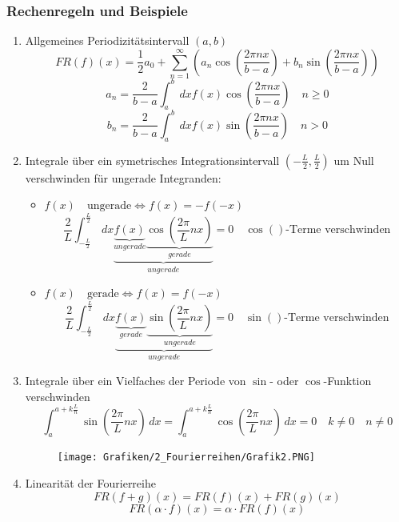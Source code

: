 \subsubsection{Rechenregeln und Beispiele}
\begin{enumerate}[label=(\roman*)]
	\item Allgemeines Periodizitätsintervall $(a,b)$
		$$FR(f)(x)= \frac{1}{2} a_0 + \sum_{n=1}^\infty \left( a_n \cos\left(\frac{2\pi n x}{b-a}\right) + b_n \sin\left(\frac{2\pi n x}{b-a}\right) \right)$$
		$$a_n = \frac{2}{b-a} \int_{a}^{b} \,dx f(x) \cos \left(\frac{2\pi n x}{b-a}\right) \quad n \geq 0$$
		$$b_n = \frac{2}{b-a} \int_{a}^{b} \,dx f(x) \sin \left(\frac{2\pi n x}{b-a}\right) \quad n>0$$	

	\item Integrale über ein symetrisches Integrationsintervall 
		$\left(-\frac{L}{2}, \frac{L}{2} \right)$ um Null verschwinden
		für ungerade Integranden:
		\begin{itemize}
			\item $f(x) \quad \textrm{ungerade} \Leftrightarrow f(x) = -f(-x)$ 
				$$\frac{2}{L} \int_{-\frac{L}{2}}^{\frac{L}{2}} \,dx \underbrace{\underbrace{f(x)}_{ungerade} \underbrace{\cos\left(\frac{2\pi}{L} n x\right)}_{gerade}}_{ungerade} = 0 \quad \cos()\textrm{-Terme verschwinden}$$
			\item $f(x) \quad \textrm{gerade} \Leftrightarrow f(x) = f(-x)$
				$$\frac{2}{L} \int_{-\frac{L}{2}}^{\frac{L}{2}} \,dx \underbrace{\underbrace{f(x)}_{gerade} \underbrace{\sin\left(\frac{2\pi}{L} n x\right)}_{ungerade}}_{ungerade} = 0 \quad \sin()\textrm{-Terme verschwinden}$$
		\end{itemize}
	\item Integrale über ein Vielfaches der Periode von $\sin$- oder 			$\cos$-Funktion verschwinden
		$$\int_{a}^{a+k\frac{L}{n}} \sin\left(\frac{2\pi}{L} n x\right) \,dx =
		\int_{a}^{a+k\frac{L}{n}} \cos\left(\frac{2\pi}{L} n x\right) \,dx = 0
		\quad k\neq 0 \quad n \neq 0$$
		\begin{figure}[H]
			\centering
			\texttt{[image: Grafiken/2\_Fourierreihen/Grafik2.PNG]}
		\end{figure}
	\item Linearität der Fourierreihe
		$$FR(f+g)(x) = FR(f)(x) + FR(g)(x)$$
		$$FR(\alpha \cdot f)(x) = \alpha \cdot FR(f)(x)$$
\end{enumerate}

